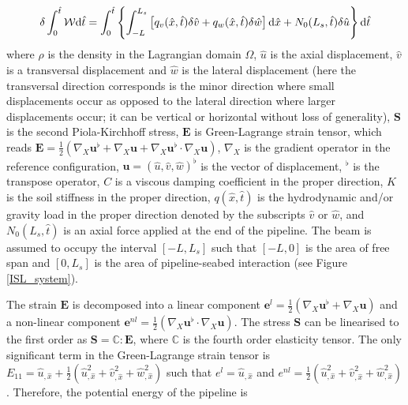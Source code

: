 \documentclass[3p,doublespacing,authoryear,11pt]{elsarticle} %
\begin{document}
\begin{equation}\label{Eq_4_4}
\delta\int_{0}^{\hat{t}} \mathcal{W}  \textup{d} \hat{t} =\int_{0}^{\hat{t}}\left \{ \int_{-L}^{L_s}\left [q_v(\hat{x},\hat{t}) \delta \hat{v} + q_w(\hat{x},\hat{t}) \delta \hat{w}  \right ] \textup{d}\hat{x} + N_0 (L_s,\hat{t})  \delta \hat{u} \right \}\textup{d} \hat{t} 
\end{equation}
where $\rho$ is the density in the Lagrangian domain $\Omega$, $\hat{u}$ is the axial displacement, $\hat{v}$ is a transversal displacement and $\hat{w}$ is the lateral displacement (here the transversal direction corresponds is the minor direction where small displacements occur as opposed to the lateral direction where larger displacements occur; it can be vertical or horizontal without loss of generality), $\boldsymbol{S}$ is the second Piola-Kirchhoff stress, $\boldsymbol{E}$ is Green-Lagrange strain tensor, which reads $\boldsymbol{E} =  \frac{1}{2} \left(  \nabla_X  \boldsymbol{u}^\flat +  \nabla_X \boldsymbol{u} +   \nabla_X \boldsymbol{u}^\flat \cdot  \nabla_X \boldsymbol{u} \right)$, $\nabla_X$ is the gradient operator in the reference configuration, $\boldsymbol{u} = (\hat{u},\hat{v},\hat{w})^\flat $ is the vector of displacement, $^\flat$ is the transpose operator, $C$ is a viscous damping coefficient in the proper direction, $K$ is the soil stiffness in the proper direction, $q(\hat{x},\hat{t})$ is the hydrodynamic and/or gravity load in the proper direction denoted by the subscripts $\hat{v}$ or $\hat{w}$, and $N_0 (L_s,\hat{t}) $ is an axial force applied at the end of the pipeline. The beam is assumed to occupy the interval $[-L,L_s]$ such that $[-L,0]$ is the area of free span and $[0,L_s]$ is the area of pipeline-seabed interaction (see Figure \ref{ISL_system}). 

 The strain $\boldsymbol{E}$ is decomposed into a linear component $\boldsymbol{e}^{l} = \frac{1}{2} \left(\nabla_X\boldsymbol{u}^\flat +  \nabla_X\boldsymbol{u} \right) $ and a non-linear component  $\boldsymbol{e}^{nl} = \frac{1}{2} \left( \nabla_X\boldsymbol{u} ^\flat \cdot  \nabla_X\boldsymbol{u} \right)$. The stress $\boldsymbol{S}$ can be linearised to the first order as $\boldsymbol{S} = \mathbb{C}:\boldsymbol{E}$, where $\mathbb{C}$ is the fourth order elasticity tensor. The only significant term in the Green-Lagrange strain tensor is $E_{11} = \hat{u}_{,\hat{x}} + \frac{1}{2} \left( \hat{u}_{,\hat{x}}^2 + \hat{v}_{,\hat{x}}^2 + \hat{w}_{,\hat{x}}^2 \right)$ such that $e^{l} =  \hat{u}_{,\hat{x}}$ and  $e^{nl} =  \frac{1}{2} \left( \hat{u}_{,\hat{x}}^2 + \hat{v}_{,\hat{x}}^2 + \hat{w}_{,\hat{x}}^2 \right)$. Therefore, the potential energy of the pipeline is
 
\end{document}
